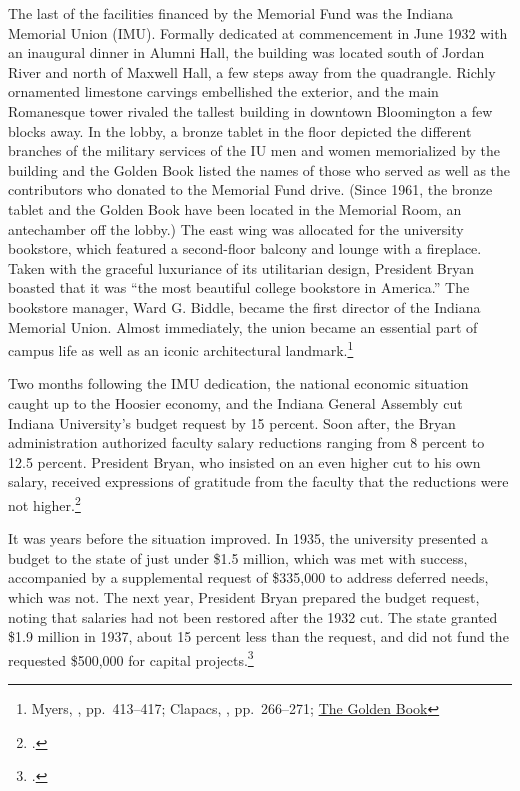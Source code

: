\documentclass[
  american,
  letterpaper,
]{scrreprt}
\begin{document}
The last of the facilities financed by the Memorial Fund was the Indiana
Memorial Union (IMU). Formally dedicated at commencement in June 1932
with an inaugural dinner in Alumni Hall, the building was located south
of Jordan River and north of Maxwell Hall, a few steps away from the
quadrangle. Richly ornamented limestone carvings embellished the
exterior, and the main Romanesque tower rivaled the tallest building in
downtown Bloomington a few blocks away. In the lobby, a bronze tablet in
the floor depicted the different branches of the military services of
the IU men and women memorialized by the building and the Golden Book
listed the names of those who served as well as the contributors who
donated to the Memorial Fund drive. (Since 1961, the bronze tablet and
the Golden Book have been located in the Memorial Room, an antechamber
off the lobby.) The east wing was allocated for the university
bookstore, which featured a second-floor balcony and lounge with a
fireplace. Taken with the graceful luxuriance of its utilitarian design,
President Bryan boasted that it was ``the most beautiful college
bookstore in America.'' The bookstore manager, Ward G. Biddle, became
the first director of the Indiana Memorial Union. Almost immediately,
the union became an essential part of campus life as well as an iconic
architectural landmark.\footnote{Myers,
  ,
  pp.~413--417; Clapacs, , pp.~266--271;
  \href{https://goldenbook.iu.edu/}{The Golden Book}}

Two months following the IMU dedication, the national economic situation
caught up to the Hoosier economy, and the Indiana General Assembly cut
Indiana University's budget request by 15 percent. Soon after, the Bryan
administration authorized faculty salary reductions ranging from 8
percent to 12.5 percent. President Bryan, who insisted on an even higher
cut to his own salary, received expressions of gratitude from the
faculty that the reductions were not higher.\footnote{.}

It was years before the situation improved. In 1935, the university
presented a budget to the state of just under \$1.5 million, which was
met with success, accompanied by a supplemental request of \$335,000 to
address deferred needs, which was not. The next year, President Bryan
prepared the budget request, noting that salaries had not been restored
after the 1932 cut. The state granted \$1.9 million in 1937, about 15
percent less than the request, and did not fund the requested \$500,000
for capital projects.\footnote{.}
\end{document}
